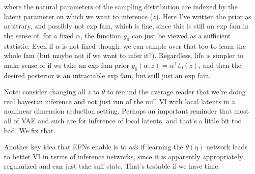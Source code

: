 \documentclass{article}
\begin{document}
 where the natural parameters of the sampling distribution are indexed by the latent parameter on which we want to inference ($z$).  Here I've written the prior as arbitrary, and possibly not exp fam, which is fine, since this is still an exp fam in the  sense of, for a fixed $\alpha$, the function $g_0$ can just be viewed as a sufficient statistic.  Even if $\alpha$ is not fixed though, we can sample over that too to learn the whole fam (but maybe not if we want to infer it?).  Regardless, life is simpler to make sense of if we take an exp fam prior $g_0(\alpha,z) = \alpha^\top t_0(z)$, and then the desired posterior is an intractable exp fam, but still just an exp fam.
 
 Note: consider changing all $z$ to $\theta$ to remind the average reader that we're doing real bayesian inference and not just run of the mill VI with local latents in a nonlinear dimension reduction setting.  Perhaps an important reminder that most all of VAE and such are for inference of local latents, and that's a little bit too bad.  We fix that.

Another key  idea that EFNs enable is to ask if learning the $\theta(\eta)$ network leads to better VI in terms of inference networks, since it is apparently appropriately regularized and can just take suff stats.  That's testable if we have time.
\end{document}

